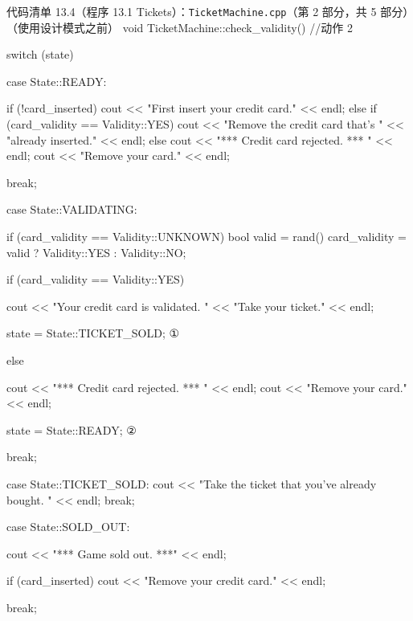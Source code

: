 \begin{codeboxt}{代码清单 13.4（程序 13.1 Tickets）：\texttt{Ticket\allowbreak{}Machine.\allowbreak{}cpp}（第 2 部分，共 5 部分）（使用设计模式之前）}
void TicketMachine::check_validity()  //动作 2
{
    switch (state)
    {
        case State::READY:
        {
            if (!card_inserted)
            {
                cout << "First insert your credit card." << endl;
            }
            else if (card_validity == Validity::YES)
            {
                cout << "Remove the credit card that’s "
                     << "already inserted." << endl;
            }
            else
            {
                cout << "*** Credit card rejected. *** " << endl;
                cout << "Remove your card." << endl;
            }

            break;
        }

        case State::VALIDATING:
        {
            if (card_validity == Validity::UNKNOWN)
            {
                bool valid = rand()%
                card_validity = valid ? Validity::YES : Validity::NO;
            }

            if (card_validity == Validity::YES)
            {
                cout << "Your credit card is validated. "
                     << "Take your ticket." << endl;

                state = State::TICKET_SOLD;                      ①
            }
            else
            {
                cout << "*** Credit card rejected. *** " << endl;
                cout << "Remove your card." << endl;

                state = State::READY;                            ②
            }

            break;
        }

        case State::TICKET_SOLD:
        {
            cout << "Take the ticket that you’ve already bought. "
                 << endl;
            break;
        }

        case State::SOLD_OUT:
        {
            cout << "*** Game sold out. ***" << endl;

            if (card_inserted)
            {
                cout << "Remove your credit card." << endl;
            }

            break;
        }
    }
}
\end{codeboxt}
\par
{}\par

